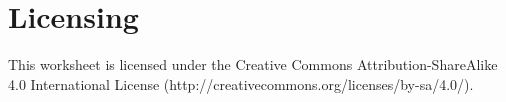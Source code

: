 \documentclass[12pt]{article}
\newcommand{\pythonscript}[2]{
\needspace{.125\textheight}
\begin{itemize}
\item[]
\end{itemize}
}
\begin{document}
%
%
%
%
%
%
%
%
%
%
%
%

\section{Licensing}

This worksheet is licensed under the Creative Commons Attribution-ShareAlike
4.0 International License (http://creativecommons.org/licenses/by-sa/4.0/).
\end{document}
